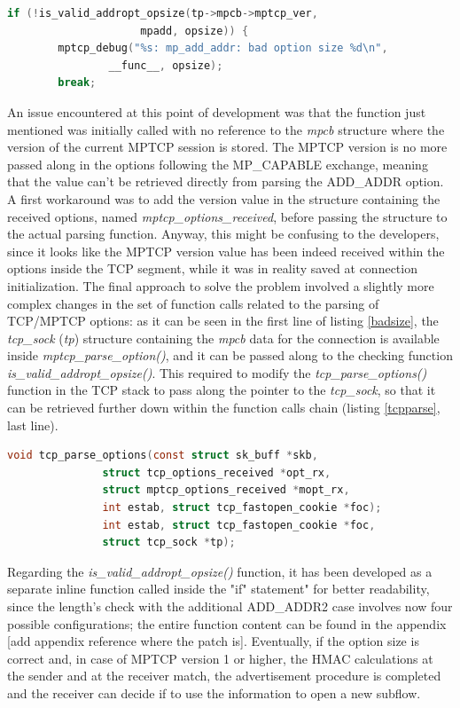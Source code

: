 \begin{lstlisting}[language=c, caption=\textit{Check ADD\_ADDR size at the receiver, inside \textit{mptcp\_parse\_option()}}, label=badsize]
	if (!is_valid_addropt_opsize(tp->mpcb->mptcp_ver,
				     mpadd, opsize)) {
 		mptcp_debug("%s: mp_add_addr: bad option size %d\n",
 			    __func__, opsize);
 		break;
\end{lstlisting}

An issue encountered at this point of development was that the function just mentioned was initially called with no reference to the \textit{mpcb} structure where the version of the current MPTCP session is stored. The MPTCP version is no more passed along in the options following the MP\_CAPABLE exchange, meaning that the value can't be retrieved directly from parsing the ADD\_ADDR option. A first workaround was to add the version value in the structure containing the received options, named \textit{mptcp\_options\_received}, before passing the structure to the actual parsing function. Anyway, this might be confusing to the developers, since it looks like the MPTCP version value has been indeed received within the options inside the TCP segment, while it was in reality saved at connection initialization. The final approach to solve the problem involved a slightly more complex changes in the set of function calls related to the parsing of TCP/MPTCP options: as it can be seen in the first line of listing \ref{badsize}, the \textit{tcp\_sock} (\textit{tp}) structure containing the \textit{mpcb} data for the connection is available inside \textit{mptcp\_parse\_option()}, and it can be passed along to the checking function \textit{is\_valid\_addropt\_opsize()}. This required to modify the \textit{tcp\_parse\_options()} function in the TCP stack to pass along the pointer to the \textit{tcp\_sock}, so that it can be retrieved further down within the function calls chain (listing \ref{tcpparse}, last line).

\begin{lstlisting}[language=c, caption=\textit{New definition for \textit{tcp\_parse\_options}}, label=tcpparse]
void tcp_parse_options(const struct sk_buff *skb,
 		       struct tcp_options_received *opt_rx,
 		       struct mptcp_options_received *mopt_rx,
		       int estab, struct tcp_fastopen_cookie *foc);
		       int estab, struct tcp_fastopen_cookie *foc,
		       struct tcp_sock *tp);
\end{lstlisting}

Regarding the \textit{is\_valid\_addropt\_opsize()} function, it has been developed as a separate inline function called inside the "if" statement" for better readability, since the length's check with the additional ADD\_ADDR2 case involves now four possible configurations; the entire function content can be found in the appendix [add appendix reference where the patch is].
Eventually, if the option size is correct and, in case of MPTCP version 1 or higher, the HMAC calculations at the sender and at the receiver match, the advertisement procedure is completed and the receiver can decide if to use the information to open a new subflow.


